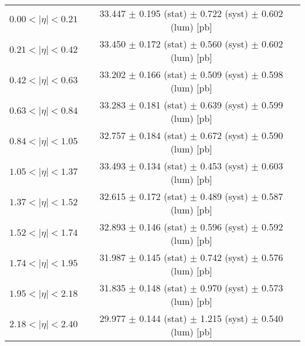 \begin{tabular}{lc}
\hline
$0.00 < |\eta| <0.21$          & 33.447 $\pm$ 0.195 (stat) $\pm$ 0.722 (syst) $\pm$ 0.602 (lum) [pb]  \\
$0.21 < |\eta| <0.42$          & 33.450 $\pm$ 0.172 (stat) $\pm$ 0.560 (syst) $\pm$ 0.602 (lum) [pb]  \\
$0.42 < |\eta| <0.63$          & 33.202 $\pm$ 0.166 (stat) $\pm$ 0.509 (syst) $\pm$ 0.598 (lum) [pb]  \\
$0.63 < |\eta| <0.84$          & 33.283 $\pm$ 0.181 (stat) $\pm$ 0.639 (syst) $\pm$ 0.599 (lum) [pb]  \\
$0.84 < |\eta| <1.05$          & 32.757 $\pm$ 0.184 (stat) $\pm$ 0.672 (syst) $\pm$ 0.590 (lum) [pb]  \\
$1.05 < |\eta| <1.37$          & 33.493 $\pm$ 0.134 (stat) $\pm$ 0.453 (syst) $\pm$ 0.603 (lum) [pb]  \\
$1.37 < |\eta| <1.52$          & 32.615 $\pm$ 0.172 (stat) $\pm$ 0.489 (syst) $\pm$ 0.587 (lum) [pb]  \\
$1.52 < |\eta| <1.74$          & 32.893 $\pm$ 0.146 (stat) $\pm$ 0.596 (syst) $\pm$ 0.592 (lum) [pb]  \\
$1.74 < |\eta| <1.95$          & 31.987 $\pm$ 0.145 (stat) $\pm$ 0.742 (syst) $\pm$ 0.576 (lum) [pb]  \\
$1.95 < |\eta| <2.18$          & 31.835 $\pm$ 0.148 (stat) $\pm$ 0.970 (syst) $\pm$ 0.573 (lum) [pb]  \\
$2.18 < |\eta| <2.40$          & 29.977 $\pm$ 0.144 (stat) $\pm$ 1.215 (syst) $\pm$ 0.540 (lum) [pb]  \\
\hline
\end{tabular}
